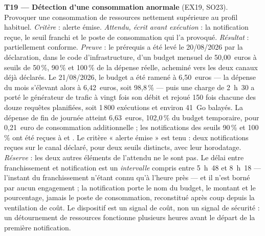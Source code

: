 \textbf{T19 --- Détection d'une consommation anormale} (EX19, SO23). Provoquer une consommation de
ressources nettement supérieure au profil habituel. \emph{Critère} : alerte émise.
\emph{Attendu, écrit avant exécution} : la notification reçue, le seuil franchi et le poste de
consommation qui l'a provoqué. \emph{Résultat} : partiellement conforme. \emph{Preuve} : le prérequis a été levé le 20/08/2026 par la déclaration, dans le code
d'infrastructure, d'un budget mensuel de 50,00~euros à seuils de 50\,\%, 90\,\% et 100\,\% de la
dépense réelle, acheminé vers les deux canaux déjà déclarés. Le 21/08/2026, le budget a été ramené
à 6,50~euros --- la dépense du mois s'élevant alors à 6,42~euros, soit 98,8\,\% --- puis une charge
de 2~h~30 a porté le générateur de trafic à vingt fois son débit et rejoué 150 fois chacune des
douze requêtes planifiées, soit 1\,800 exécutions et environ 41~Go balayés. La dépense de fin de
journée atteint 6,63~euros, 102,0\,\% du budget temporaire, pour 0,21~euro de consommation
additionnelle ; les notifications des seuils 90\,\% et 100\,\% ont été reçues à  et
. Le critère « alerte émise » est tenu : deux notifications reçues sur le canal déclaré, pour deux
seuils distincts, avec leur horodatage. \emph{Réserve} : les deux autres éléments de l'attendu ne le
sont pas. Le délai entre franchissement et notification est un \emph{intervalle} compris entre
5~h~48 et 8~h~18 --- l'instant du franchissement n'étant connu qu'à l'heure près --- et il n'est
borné par aucun engagement ; la notification porte le nom du budget, le montant et le pourcentage,
jamais le poste de consommation, reconstitué après coup depuis la ventilation de coût. Le
dispositif est un signal de coût, non un signal de sécurité : un détournement de ressources
fonctionne plusieurs heures avant le départ de la première notification.


